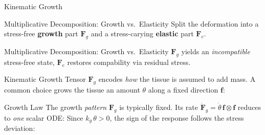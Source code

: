 \begin{frame}[t]{}
  \vfill\begin{center}{\Huge\color{YaleBlue} Kinematic Growth}
  \end{center}\vfill
\end{frame}

\begin{frame}[t]{Multiplicative Decomposition: Growth vs.\ Elasticity}
  Split the deformation into a stress-free \textbf{growth} part $\bm{F}_g$ and a stress-carying \textbf{elastic} part $\bm{F}_e$.
\end{frame}

\begin{frame}[t]{Multiplicative Decomposition: Growth vs.\ Elasticity}
  $\bm{F}_g$ yields an \emph{incompatible} stress-free state, $\bm{F}_e$ restores compability via residual stress.
  \vfill
  \begin{center}\kinmap[1.0]\end{center}
  \vfill
\end{frame}

\begin{frame}[t]{Kinematic Growth Tensor}
  $\bm{F}_g$ encodes \emph{how} the tissue is assumed to add mass. A common choice grows the tissue
  an amount $\theta$ along a fixed direction $\bm{f}$:
\end{frame}

\begin{frame}[t]{Growth Law}
  The growth \emph{pattern} $\bm{F}_g$ is typically fixed. Its rate
  $\dot{\bm{F}}_g=\dot\theta\,\bm{f}\!\otimes\bm{f}$ reduces to \emph{one}
  scalar ODE:
  Since $k_g\,\theta>0$, the sign of the response follows the stress deviation:
\end{frame}


